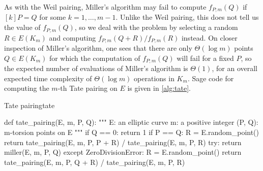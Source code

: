 As with the Weil pairing, Miller's algorithm may fail to compute $f_{P;m}(Q)$ if $[k]P = Q$ for some $k = 1, \ldots, m-1$. Unlike the Weil pairing, this does not tell us the value of $f_{P;m}(Q)$, so we deal with the problem by selecting a random $R \in E(K_m)$ and computing $f_{P;m}(Q + R) / f_{P;m}(R)$ instead. On closer inspection of Miller's algorithm, one sees that there are only $\Theta(\log m)$ points $Q \in E(K_m)$ for which the computation of $f_{P;m}(Q)$ will fail for a fixed $P$, so the expected number of evaluations of Miller's algorithm is $\Theta(1)$, for an overall expected time complexity of $\Theta(\log m)$ operations in $K_m$. Sage code for computing the $m$-th Tate pairing on $E$ is given in \cref{alg:tate}.

\begin{alg}{Tate pairing}{tate}
\begin{sagecode}
def tate_pairing(E, m, P, Q):
    """
    E: an elliptic curve
    m: a positive integer
    (P, Q): m-torsion points on E
    """
    if Q == 0:
        return 1
    if P == Q:
        R = E.random_point()
        return tate_pairing(E, m, P, P + R) / tate_pairing(E, m, P, R)
    try:
        return miller(E, m, P, Q)
    except ZeroDivisionError:
        R = E.random_point()
        return tate_pairing(E, m, P, Q + R) / tate_pairing(E, m, P, R)
\end{sagecode}
\end{alg}

